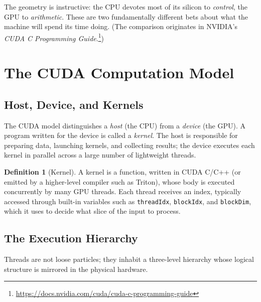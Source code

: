 \documentclass[11pt,a4paper]{article}
\theoremstyle{definition}
\newtheorem{definition}{Definition}[section]
\theoremstyle{remark}
\theoremstyle{plain}
\begin{document}
The geometry is instructive: the CPU devotes most of its silicon to
\emph{control}, the GPU to \emph{arithmetic}. These are two
fundamentally different bets about what the machine will spend its
time doing. (The comparison originates in NVIDIA's \textit{CUDA C
Programming Guide}.\footnote{\url{https://docs.nvidia.com/cuda/cuda-c-programming-guide}})

\section{The CUDA Computation Model}

\subsection{Host, Device, and Kernels}

The CUDA model distinguishes a \emph{host} (the CPU) from a
\emph{device} (the GPU). A program written for the device is called
a \emph{kernel}. The host is responsible for preparing data,
launching kernels, and collecting results; the device executes each
kernel in parallel across a large number of lightweight threads.

\begin{definition}[Kernel]
A kernel is a function, written in CUDA C/C++ (or emitted by a
higher-level compiler such as Triton), whose body is executed
concurrently by many GPU threads. Each thread receives an index,
typically accessed through built-in variables such as
\texttt{threadIdx}, \texttt{blockIdx}, and \texttt{blockDim}, which
it uses to decide what slice of the input to process.
\end{definition}

\subsection{The Execution Hierarchy}

Threads are not loose particles; they inhabit a three-level
hierarchy whose logical structure is mirrored in the physical
hardware.
\end{document}
